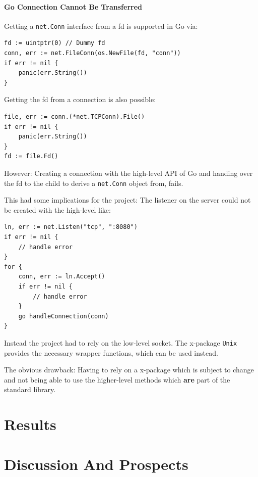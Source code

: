 \documentclass[10pt,a4paper,titlepage,twoside,english,final]{zhawreprt}
\begin{document}
\subsubsection{Go Connection Cannot Be Transferred}\label{sssec:GoConnectionCannotBeTransferred}
Getting a \texttt{net.Conn} interface from a \gls{fd} is supported in \gls{Go} via:
\setlistingGo
\begin{lstlisting}[caption={Getting a \texttt{net.Conn} interface from a \gls{fd}},label=lst:ConnFromFD]
fd := uintptr(0) // Dummy fd
conn, err := net.FileConn(os.NewFile(fd, "conn"))
if err != nil {
	panic(err.String())
}
\end{lstlisting}

Getting the \gls{fd} from a connection is also possible:
\setlistingGo
\begin{lstlisting}[caption={Getting the \gls{fd} from a \texttt{net.Conn} object},label=lst:FDFromConn]
file, err := conn.(*net.TCPConn).File()
if err != nil {
	panic(err.String())
}
fd := file.Fd()
\end{lstlisting}

However: Creating a connection with the high-level \gls{API} of \gls{Go} and handing over the \gls{fd} to the child to derive a \texttt{net.Conn} object from, fails.

This had some implications for the project: The listener on the server could not be created with the high-level like:
\setlistingGo
\begin{lstlisting}[caption={\gls{Go}'s high level \gls{API} for listener},label=lst:ListenForConn]
ln, err := net.Listen("tcp", ":8080")
if err != nil {
	// handle error
}
for {
	conn, err := ln.Accept()
	if err != nil {
		// handle error
	}
	go handleConnection(conn)
}
\end{lstlisting}

Instead the project had to rely on the low-level \gls{socket}. The \gls{x-package} \texttt{Unix} provides the necessary wrapper functions, which can be used instead.

The obvious drawback: Having to rely on a \gls{x-package} which is subject to change and not being able to use the higher-level methods which \textbf{are} part of the standard library.


\chapter{Results}\label{chp:Results}

\chapter{Discussion And Prospects}\label{chp:DiscussionAndProspects}
\end{document}
